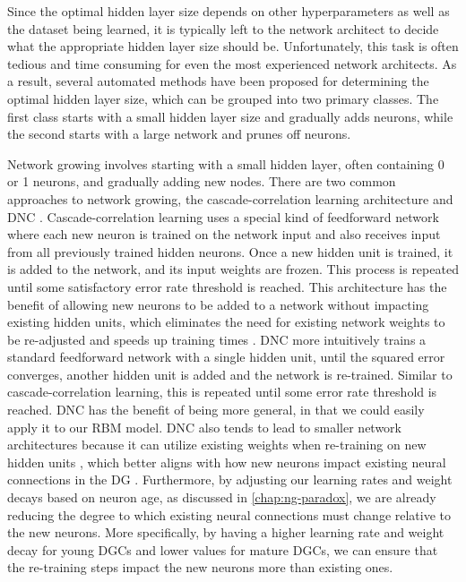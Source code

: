 Since the optimal hidden layer size depends on other hyperparameters as well 
as the dataset being learned, it is typically left to the network 
architect to decide what the appropriate 
hidden layer size should be. 
Unfortunately, this task is often 
tedious and time consuming for even the most experienced network 
architects. 
As a result, several automated methods 
have been proposed for determining the optimal hidden 
layer size, which can be grouped into two 
primary classes. 
The first class starts with a small hidden 
layer size and gradually adds neurons, while the second 
starts with a large network and prunes off neurons.

Network growing involves starting with a small hidden layer, 
often containing 0 or 1 neurons, and gradually adding new nodes. 
There are two common approaches to network growing, the 
cascade-correlation learning architecture \citep{cascade-correlation} 
and \ac{DNC} \citep{DNC}. 
Cascade-correlation learning uses a special kind of feedforward network where
each new neuron is trained on the network input and also receives input from all 
previously trained hidden neurons. 
Once a new hidden unit is trained, 
it is added to the network, and its input weights are frozen. 
This process is repeated
until some satisfactory error rate threshold is reached. 
This architecture has the benefit of allowing new neurons to be 
added to a network without impacting existing hidden units, 
which eliminates the need for existing network weights 
to be re-adjusted and speeds up training times \citep{cascade-correlation}.
\Ac{DNC} more intuitively trains a standard 
feedforward network with a single hidden unit, 
until the squared error converges, another 
hidden unit is added and the network is re-trained. 
Similar to cascade-correlation learning, 
this is repeated until some error rate threshold 
is reached.
\Ac{DNC} has the benefit of being more general, in that we could 
easily apply it to our \ac{RBM} model.
\Ac{DNC} also tends to lead to 
smaller network architectures because it can utilize existing weights 
when re-training on new hidden units \citep{DNC}, 
which better aligns with how new neurons impact 
existing neural connections in the \ac{DG} \citep{mcavoy-et-al-15}. 
Furthermore, by adjusting our learning rates and weight decays based on neuron age, as 
discussed in \cref{chap:ng-paradox}, we are already reducing the degree to which 
existing neural connections must change relative to the new neurons. 
More specifically, by having a higher learning rate and weight decay for 
young \acp{DGC} and lower values for mature \acp{DGC}, we can ensure 
that the re-training steps impact the new neurons more than existing ones.

